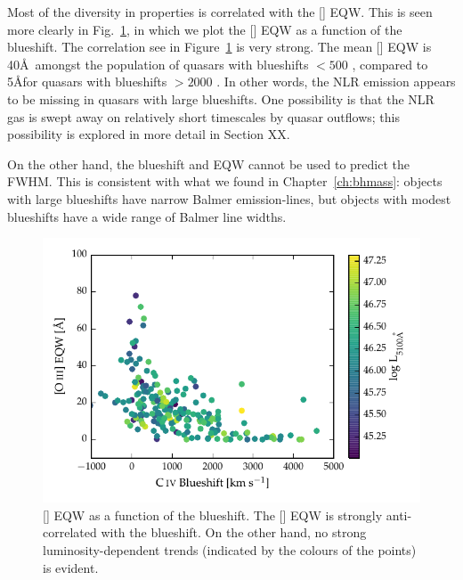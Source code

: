 Most of the diversity in  properties is correlated with the [] EQW. 
This is seen more clearly in Fig.~\ref{fig:civ_blueshift_oiii_eqw}, in which we plot the [] EQW as a function of the  blueshift. 
The correlation see in Figure~\ref{fig:civ_blueshift_oiii_eqw} is very strong. 
The mean [] EQW is 40\AA\, amongst the population of quasars with  blueshifts $<500$ \kms, compared to 5\AA for quasars with  blueshifts $>2000$ \kms. 
In other words, the NLR emission appears to be missing in quasars with large  blueshifts. 
One possibility is that the NLR gas is swept away on relatively short timescales by quasar outflows; this possibility is explored in more detail in Section XX. 

On the other hand, the  blueshift and EQW cannot be used to predict the \hb FWHM. 
This is consistent with what we found in Chapter~\ref{ch:bhmass}: objects with large  blueshifts have narrow Balmer emission-lines, but objects with modest  blueshifts have a wide range of Balmer line widths. 

\begin{figure}
    \centering
    \includegraphics[width=\columnwidth]{figures/chapter04/civ_blueshift_oiii_eqw.pdf} 
    \caption[{[] EQW as a function of the  blueshift.}]{[] EQW as a function of the  blueshift. The [] EQW is strongly anti-correlated with the  blueshift. On the other hand, no strong luminosity-dependent trends (indicated by the colours of the points) is evident.}     
    \label{fig:civ_blueshift_oiii_eqw}
\end{figure}


